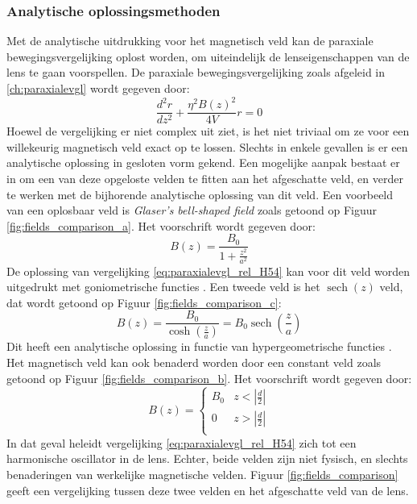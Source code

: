 \documentclass[we,twoside,openright,a4paper,11pt]{uantwerpenbamathesis}
\begin{document}
\subsubsection{Analytische oplossingsmethoden}
Met de analytische uitdrukking voor het magnetisch veld kan de paraxiale bewegingsvergelijking oplost worden, om uiteindelijk de lenseigenschappen van de lens te gaan voorspellen. De paraxiale bewegingsvergelijking zoals afgeleid in \ref{ch:paraxialevgl} wordt gegeven door:
\begin{equation}\label{eq:paraxialevgl_rel_H54}
    \frac{d^2r}{dz^2}+\frac{\eta^2B(z)^2}{4V}r=0
\end{equation}
Hoewel de vergelijking er niet complex uit ziet, is het niet triviaal om ze voor een willekeurig magnetisch veld exact op te lossen. Slechts in enkele gevallen is er een analytische oplossing in gesloten vorm gekend. Een mogelijke aanpak bestaat er in om een van deze opgeloste velden te fitten aan het afgeschatte veld, en verder te werken met de bijhorende analytische oplossing van dit veld. Een voorbeeld van een oplosbaar veld is \textit{Glaser's bell-shaped field} zoals getoond op Figuur \ref{fig:fields_comparison_a}. Het voorschrift wordt gegeven door:
\begin{equation}\label{eq:Glasers_field}
    B(z) = \frac{B_0}{1+\frac{z^2}{a^2}}
\end{equation}
De oplossing van vergelijking \ref{eq:paraxialevgl_rel_H54} kan voor dit veld worden uitgedrukt met goniometrische functies \cite{PWHawkes}. Een tweede veld is het $\operatorname*{sech}(z)$ veld, dat wordt getoond op Figuur \ref{fig:fields_comparison_c}:
\begin{equation}\label{eq:sech_field}
    B(z) = \frac{B_0}{\cosh\left(\frac{z}{a}\right)} = B_0\operatorname*{sech}\left(\frac{z}{a}\right)
\end{equation}
Dit heeft een analytische oplossing in functie van hypergeometrische functies \cite{el_kareh_1970}. Het magnetisch veld kan ook benaderd worden door een constant veld zoals getoond op Figuur \ref{fig:fields_comparison_b}. Het voorschrift wordt gegeven door:
\begin{equation}\label{eq:constant_field}
    B(z) = 
    \begin{cases}
        B_0 & z<\left|\frac{d}{2}\right|\\
        0 & z>\left|\frac{d}{2}\right|\\
    \end{cases}
\end{equation}
In dat geval heleidt vergelijking \ref{eq:paraxialevgl_rel_H54} zich tot een harmonische oscillator in de lens. Echter, beide velden zijn niet fysisch, en slechts benaderingen van werkelijke magnetische velden. Figuur \ref{fig:fields_comparison} geeft een vergelijking tussen deze twee velden en het afgeschatte veld van de lens.
\end{document}
